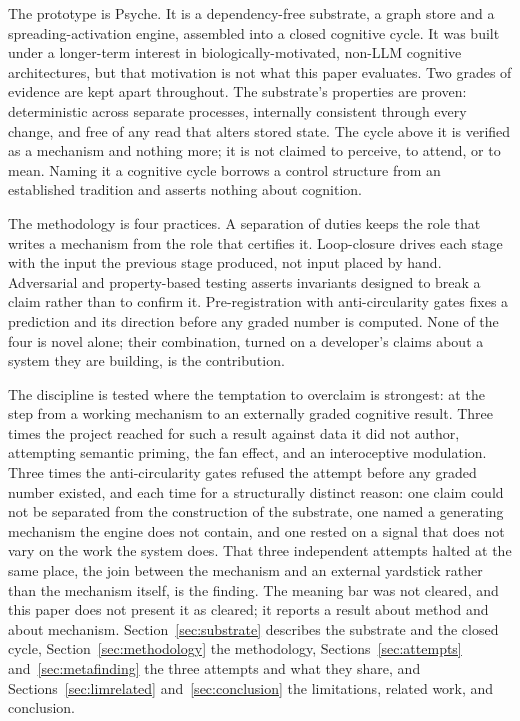 \documentclass[conference]{IEEEtran}
\begin{document}
The prototype is Psyche.
It is a dependency-free substrate, a graph store and a spreading-activation
engine, assembled into a closed cognitive cycle. It was built under a longer-term
interest in biologically-motivated, non-LLM cognitive architectures, but that motivation
is not what this paper evaluates. Two grades of evidence are kept apart throughout. The
substrate's properties are proven: deterministic across separate processes, internally
consistent through every change, and free of any read that alters stored state. The
cycle above it is verified as a mechanism and nothing more; it is not claimed to
perceive, to attend, or to mean. Naming it a cognitive cycle borrows a control structure
from an established tradition and asserts nothing about cognition.

The methodology is four practices. A separation of duties keeps the role that writes a
mechanism from the role that certifies it. Loop-closure drives each stage with the input
the previous stage produced, not input placed by hand. Adversarial and property-based
testing asserts invariants designed to break a claim rather than to confirm it.
Pre-registration with anti-circularity gates fixes a prediction and its direction before
any graded number is computed. None of the four is novel alone; their combination, turned
on a developer's claims about a system they are building, is the contribution.

The discipline is tested where the temptation to overclaim is strongest: at the step from
a working mechanism to an externally graded cognitive result. Three times the project
reached for such a result against data it did not author, attempting semantic priming, the
fan effect, and an interoceptive modulation. Three times the anti-circularity gates
refused the attempt before any graded number existed, and each time for a structurally
distinct reason: one claim could not be separated from the construction of the substrate,
one named a generating mechanism the engine does not contain, and one rested on a signal
that does not vary on the work the system does. That three independent attempts halted at
the same place, the join between the mechanism and an external yardstick rather than the
mechanism itself, is the finding. The meaning bar was not cleared, and this paper does not
present it as cleared; it reports a result about method and about mechanism.
Section~\ref{sec:substrate} describes the substrate and the closed cycle,
Section~\ref{sec:methodology} the methodology, Sections~\ref{sec:attempts}
and~\ref{sec:metafinding} the three attempts and what they share, and
Sections~\ref{sec:limrelated} and~\ref{sec:conclusion} the limitations, related work, and
conclusion.
\end{document}
